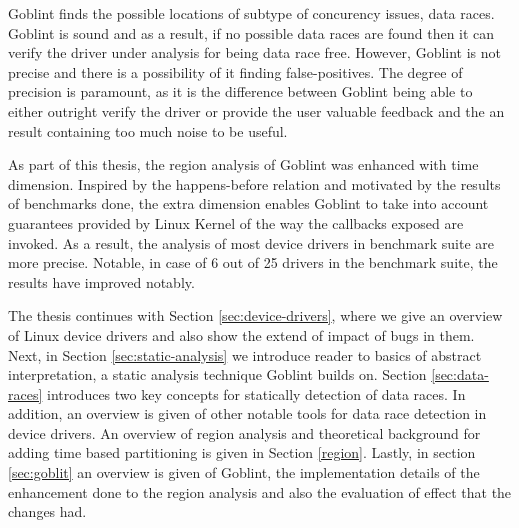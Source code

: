 \documentclass[..thesis.tex]{subfiles}
\begin{document}
Goblint finds the possible locations of subtype of concurency issues, data races. Goblint is sound and as a result, if no possible data races are found then it can verify the driver under analysis for being data race free. However, Goblint is not precise and there is a possibility of it finding false-positives. The degree of precision is paramount, as it is the difference between Goblint being able to either outright verify the driver or provide the user valuable feedback and the an result containing too much noise to be useful.
  

As part of this thesis, the region analysis of Goblint was enhanced with time dimension. Inspired by the happens-before relation and motivated by the results of benchmarks done, the extra dimension enables Goblint to take into account guarantees provided by Linux Kernel of the way the callbacks exposed are invoked. As a result, the analysis of most device drivers in benchmark suite are more precise. Notable, in case of 6 out of 25 drivers in the benchmark suite, the results have improved notably.


The thesis continues with Section \ref{sec:device-drivers}, where we give an overview of Linux device drivers and also show the extend of impact of bugs in them. Next, in Section \ref{sec:static-analysis} we introduce reader to basics of abstract interpretation, a static analysis technique Goblint builds on. Section \ref{sec:data-races} introduces two key concepts for statically detection of data races. In addition, an overview is given of other notable tools for data race detection in device drivers. An overview of region analysis and theoretical background for adding time based partitioning is given in Section \ref{region}. Lastly, in section \ref{sec:goblit} an overview is given of Goblint, the implementation details of the enhancement done to the region analysis and also the evaluation of effect that the changes had.  
\end{document}
